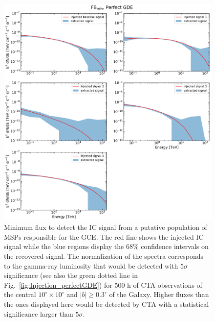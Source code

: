 \documentclass[doublespace,nopageskip]{VTthesis} %
\begin{document}
\begin{figure}
    \begin{center}
    \includegraphics[width=\textwidth]{Figures/CTA/all-signal-spectra-mis-False-Fermi-min-True.pdf}
    \caption{Minimum flux to detect the IC signal from a putative population of MSPs responsible for the GCE. The red line shows the injected IC signal while the blue regions display the 68\% confidence intervals on the recovered signal. The normalization of the spectra corresponds to the gamma-ray luminosity that would be detected with $5\sigma$ significance (see also the green dotted line in Fig.~\ref{fig:Injection_perfectGDE}) for 500 h of CTA observations of the central $10^\circ\times10^\circ$ and $|b|\geq0.3^\circ$ of the Galaxy. Higher fluxes than the ones displayed here would be detected by CTA with a statistical significance larger than $5\sigma$.      }
    \label{fig:RecoveredSpectrum_perfectGDEFBmin}
    \end{center}
\end{figure}
\end{document}
